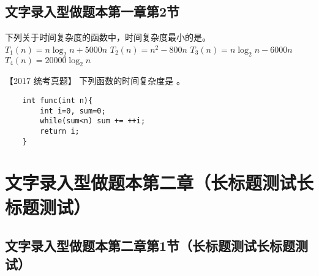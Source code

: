 \documentclass[standard]{ExBook}
\begin{document}
\subsection{文字录入型做题本第一章第2节}

\begin{qitems}

    \begin{bbox}
        \qitem   下列关于时间复杂度的函数中，时间复杂度最小的是\blankbox 。
        \fourchoices
        {$T_1(n)=n\log_2n +5000n$}
        {$T_2(n)=n^2 - 800n$}
        {$T_3(n)=n\log_2n - 6000n$}
        {$T_4(n)=20000\log_2n$}
    \end{bbox}

    \begin{bbox}
        \qitem   【2017 统考真题】 下列函数的时间复杂度是 \blankbox 。
        \begin{lstlisting}
    int func(int n){
        int i=0, sum=0;
        while(sum<n) sum += ++i;
        return i; 
    }
        \end{lstlisting}
    \end{bbox}

\end{qitems}

\section{文字录入型做题本第二章（长标题测试长标题测试）}
\subsection{文字录入型做题本第二章第1节（长标题测试长标题测试）}
\end{document}
